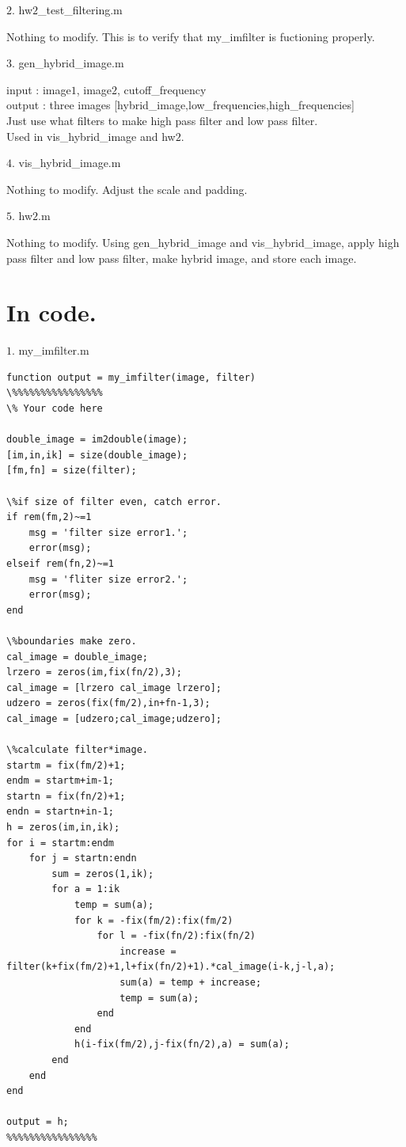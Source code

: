 {\large $2.$ hw$2$\_test\_filtering.m \par}
\tab Nothing to modify. This is to verify that my\_imfilter is fuctioning properly.

{\large $3.$ gen\_hybrid\_image.m \par}
\tab input : image$1$, image$2$, cutoff\_frequency \\
\tab output : three images [hybrid\_image,low\_frequencies,high\_frequencies] \\
\tab Just use what filters to make high pass filter and low pass filter. \\ \tab Used in vis\_hybrid\_image and hw$2$.

{\large $4.$ vis\_hybrid\_image.m \par}
\tab Nothing to modify. Adjust the scale and padding. 

{\large $5.$ hw$2$.m  \par}
\tab Nothing to modify. Using gen\_hybrid\_image and vis\_hybrid\_image, apply high pass filter and low pass filter, make hybrid image, and store each image.


\section*{In code.}
{\large $1.$ my\_imfilter.m \par}
\begin{lstlisting}[style=Matlab-editor]
function output = my_imfilter(image, filter)
\%%%%%%%%%%%%%%%%
\% Your code here

double_image = im2double(image);
[im,in,ik] = size(double_image);
[fm,fn] = size(filter);

\%if size of filter even, catch error.
if rem(fm,2)~=1
    msg = 'filter size error1.';
    error(msg);
elseif rem(fn,2)~=1
    msg = 'fliter size error2.';
    error(msg);
end

\%boundaries make zero.
cal_image = double_image;
lrzero = zeros(im,fix(fn/2),3);
cal_image = [lrzero cal_image lrzero];
udzero = zeros(fix(fm/2),in+fn-1,3);
cal_image = [udzero;cal_image;udzero];

\%calculate filter*image.
startm = fix(fm/2)+1;
endm = startm+im-1;
startn = fix(fn/2)+1;
endn = startn+in-1;
h = zeros(im,in,ik);
for i = startm:endm
    for j = startn:endn
        sum = zeros(1,ik);
        for a = 1:ik    
            temp = sum(a);
            for k = -fix(fm/2):fix(fm/2)
                for l = -fix(fn/2):fix(fn/2)
                    increase = filter(k+fix(fm/2)+1,l+fix(fn/2)+1).*cal_image(i-k,j-l,a);
                    sum(a) = temp + increase;
                    temp = sum(a);
                end
            end
            h(i-fix(fm/2),j-fix(fn/2),a) = sum(a);
        end
    end
end

output = h;
%%%%%%%%%%%%%%%%
\end{lstlisting}

